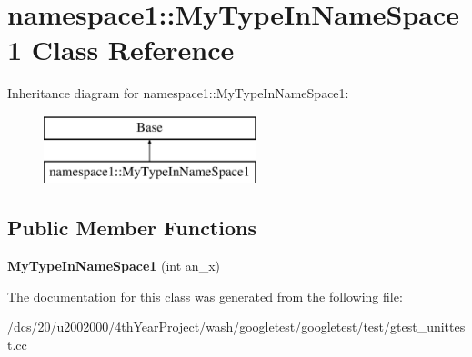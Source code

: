 \hypertarget{classnamespace1_1_1MyTypeInNameSpace1}{}\section{namespace1\+:\+:My\+Type\+In\+Name\+Space1 Class Reference}
\label{classnamespace1_1_1MyTypeInNameSpace1}
Inheritance diagram for namespace1\+:\+:My\+Type\+In\+Name\+Space1\+:\begin{figure}[H]
\begin{center}
\leavevmode
\includegraphics[height=2.000000cm]{classnamespace1_1_1MyTypeInNameSpace1}
\end{center}
\end{figure}
\subsection*{Public Member Functions}
\begin{DoxyCompactItemize}
\item 
\mbox{\label{classnamespace1_1_1MyTypeInNameSpace1_a2e4277aa118e9b83045a18392188a0d8}} 
{\bfseries My\+Type\+In\+Name\+Space1} (int an\+\_\+x)
\end{DoxyCompactItemize}


The documentation for this class was generated from the following file\+:\begin{DoxyCompactItemize}
\item 
/dcs/20/u2002000/4th\+Year\+Project/wash/googletest/googletest/test/gtest\+\_\+unittest.\+cc\end{DoxyCompactItemize}
